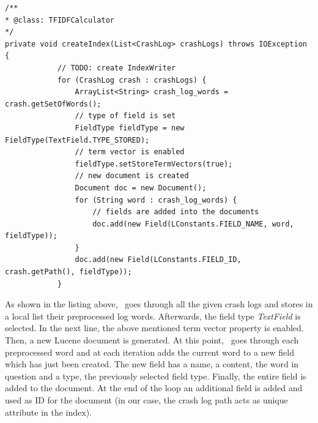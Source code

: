 \begin{lstlisting}[caption=\TFIDF\ describing the Lucene indexing process,label={lst: indexing}]
/**
* @class: TFIDFCalculator
*/
private void createIndex(List<CrashLog> crashLogs) throws IOException {
			// TODO: create IndexWriter
            for (CrashLog crash : crashLogs) {
                ArrayList<String> crash_log_words = crash.getSetOfWords();
                // type of field is set
                FieldType fieldType = new FieldType(TextField.TYPE_STORED); 
                // term vector is enabled
                fieldType.setStoreTermVectors(true); 
                // new document is created
                Document doc = new Document(); 
                for (String word : crash_log_words) {
                    // fields are added into the documents
                    doc.add(new Field(LConstants.FIELD_NAME, word, fieldType)); 
                }
                doc.add(new Field(LConstants.FIELD_ID, crash.getPath(), fieldType));
            }
\end{lstlisting} 
As shown in the listing above, \toolname\ goes through all the given crash logs and stores in a local list their preprocessed log words. 
Afterwards, the field type \textit{TextField} is selected. 
In the next line, the above mentioned term vector property is enabled. Then, a new Lucene document is generated. 
At this point, \toolname\ goes through each preprocessed word and at each iteration adds the current word to a new field which has just been created. The new field has a name, a content, \ie the word in question and a type, \ie the previously selected field type. Finally, the entire field is added to the document. At the end of the loop an additional field is added and used as ID for the document (in our case, the crash log path acts as unique attribute in the index). 

